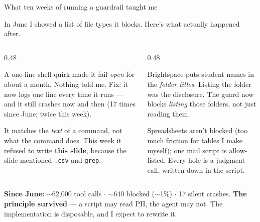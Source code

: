 \begin{frame}{What ten weeks of running a guardrail taught me}
\vskip-4pt
{\small In June I showed a list of file types it blocks. Here's what actually happened after.\par}
\vskip2pt
\begin{columns}[T]
\begin{column}{0.48\textwidth}
\begin{tcolorbox}[dontbox, title={\faEyeSlash\quad It failed silently}, top=2pt, bottom=2pt]
\scriptsize A one-line shell quirk made it fail \emph{open} for about a month. Nothing told me. Fix: it now logs one line every time it runs --- and it still crashes now and then (17 times since June; twice this week).
\end{tcolorbox}
\vskip3pt
\begin{tcolorbox}[dontbox, title={\faBan\quad It over-blocks}, top=2pt, bottom=2pt]
\scriptsize It matches the \emph{text} of a command, not what the command does. This week it refused to write \textbf{this slide}, because the slide mentioned \texttt{.csv} and \texttt{grep}.
\end{tcolorbox}
\end{column}
\begin{column}{0.48\textwidth}
\begin{tcolorbox}[keybox, title={\faFolderOpen\quad The leak wasn't in the files}, top=2pt, bottom=2pt]
\scriptsize Brightspace puts student names in the \emph{folder titles}. Listing the folder was the disclosure. The guard now blocks \emph{listing} those folders, not just reading them.
\end{tcolorbox}
\vskip3pt
\begin{tcolorbox}[keybox, title={\faHandPaper\quad Deliberate holes}, top=2pt, bottom=2pt]
\scriptsize Spreadsheets aren't blocked (too much friction for tables I make myself); one mail script is allow-listed. Every hole is a judgment call, written down in the script.
\end{tcolorbox}
\end{column}
\end{columns}
\vskip2pt
\begin{tcolorbox}[quotebox, top=1pt, bottom=1pt]
\scriptsize \textbf{Since June:} $\sim$62,000 tool calls $\cdot$ $\sim$640 blocked ($\sim$1\%) $\cdot$ 17 silent crashes. \textbf{The principle survived} --- a script may read PII, the agent may not. The implementation is disposable, and I expect to rewrite it.
\end{tcolorbox}
\end{frame}


